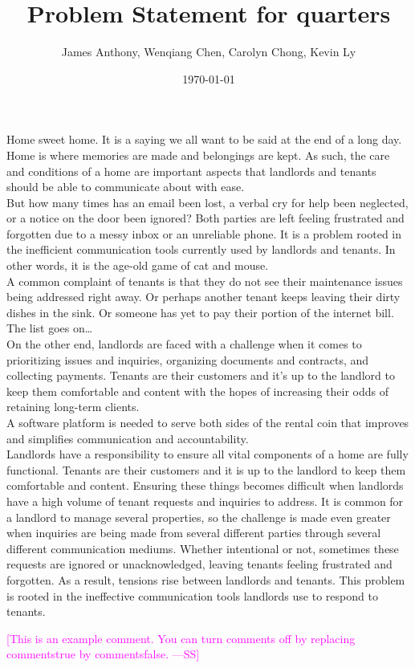 \documentclass[12pt]{article}
\newcommand{\authornote}[3]{\textcolor{#1}{[#3 ---#2]}}
\newcommand{\authornote}[3]{}
\newcommand{\wss}[1]{\authornote{magenta}{SS}{#1}}
\begin{document}
\title{Problem Statement for quarters} 
\author{James Anthony, Wenqiang Chen, Carolyn Chong, Kevin Ly}
\date{\today}
	
\maketitle

Home sweet home. It is a saying we all want to be said at the end of a long day. Home is where memories are made and belongings are kept. As such, the care and conditions of a home are important aspects that landlords and tenants should be able to communicate about with ease. \\

But how many times has an email been lost, a verbal cry for help been neglected, or a notice on the door been ignored? Both parties are left feeling frustrated and forgotten due to a messy inbox or an unreliable phone. It is a problem rooted in the inefficient communication tools currently used by landlords and tenants. In other words, it is the age-old game of cat and mouse.\\
 
A common complaint of tenants is that they do not see their maintenance issues being addressed right away. Or perhaps another tenant keeps leaving their dirty dishes in the sink. Or someone has yet to pay their portion of the internet bill. The list goes on\ldots \\

On the other end, landlords are faced with a challenge when it comes to prioritizing issues and inquiries, organizing documents and contracts, and collecting payments. Tenants are their customers and it's up to the landlord to keep them comfortable and content with the hopes of increasing their odds of retaining long-term clients.\\

A software platform is needed to serve both sides of the rental coin that improves and simplifies communication and accountability.\\

Landlords have a responsibility to ensure all vital components of a home are fully functional. Tenants are their customers and it is up to the landlord to keep them comfortable and content. Ensuring these things becomes difficult when landlords have a high volume of tenant requests and inquiries to address. It is common for a landlord to manage several properties, so the challenge is made even greater when inquiries are being made from several different parties through several different communication mediums. Whether intentional or not, sometimes these requests are ignored or unacknowledged, leaving tenants feeling frustrated and forgotten. As a result, tensions rise between landlords and tenants. This problem is rooted in the ineffective communication tools landlords use to respond to tenants. 

\wss{This is an example comment.  You can turn comments off by replacing
  commentstrue by commentsfalse.}
\end{document}
